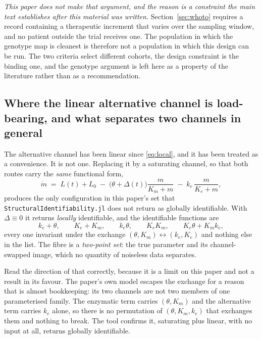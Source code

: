 \begin{itemize}[leftmargin=*]
\emph{This paper does not make that argument, and the reason is a constraint the main text
establishes after this material was written.} Section~\ref{sec:whoto} requires a record
containing a therapeutic increment that varies over the sampling window, and no patient
outside the trial receives one. The population in which the genotype map is cleanest is
therefore not a population in which this design can be run. The two criteria select
different cohorts, the design constraint is the binding one, and the genotype argument is
left here as a property of the literature rather than as a recommendation.
\end{itemize}



\subsection{Where the linear alternative channel is load-bearing, and what separates two channels in general}
\label{sec:modelB}

The alternative channel has been linear since \eqref{eq:local}, and it has been treated as
a convenience. It is not one. Replacing it by a saturating channel, so that both routes
carry the \emph{same} functional form,
\begin{equation}
\dot m \;=\; L(t) + L_0 \;-\; \bigl(\theta + \Delta(t)\bigr)\frac{m}{K_m + m}
\;-\; k_e\, \frac{m}{K_e + m},
\label{eq:modelB}
\end{equation}
produces the only configuration in this paper's set that
\texttt{StructuralIdentifiability.jl} does not return as globally identifiable. With
$\Delta \equiv 0$ it returns \emph{locally} identifiable, and the identifiable functions
are
\begin{equation}
k_e + \theta, \qquad K_e + K_m, \qquad k_e\theta, \qquad K_e K_m, \qquad
K_e\theta + K_m k_e,
\label{eq:Binvariants}
\end{equation}
every one invariant under the exchange $(\theta, K_m) \leftrightarrow (k_e, K_e)$ and
nothing else in the list. The fibre is a \emph{two-point set}: the true parameter and its
channel-swapped image, which no quantity of noiseless data separates.

Read the direction of that correctly, because it is a limit on this paper and not a
result in its favour. The paper's own model escapes the exchange for a reason that is
almost bookkeeping: its two channels are not two members of one parameterised family. The
enzymatic term carries $(\theta, K_m)$ and the alternative term carries $k_e$ alone, so
there is no permutation of $(\theta, K_m, k_e)$ that exchanges them and nothing to break.
The tool confirms it, saturating plus linear, with no input at all, returns globally
identifiable.

